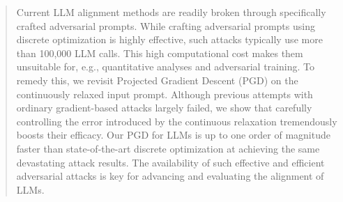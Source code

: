 \documentclass{article}
\theoremstyle{plain}
\theoremstyle{definition}
\theoremstyle{remark}
\begin{document}



\printAffiliationsAndNotice{\icmlEqualContribution} %

\begin{abstract}
Current LLM alignment methods are readily broken through specifically crafted adversarial prompts. While crafting adversarial prompts using discrete optimization is highly effective, such attacks typically use more than 100,000 LLM calls. This high computational cost makes them unsuitable for, e.g., quantitative analyses and adversarial training. To remedy this, we revisit Projected Gradient Descent (PGD) on the continuously relaxed input prompt. Although previous attempts with ordinary gradient-based attacks largely failed, we show that carefully controlling the error introduced by the continuous relaxation tremendously boosts their efficacy. Our PGD for LLMs is up to one order of magnitude faster than state-of-the-art discrete optimization at achieving the same devastating attack results. The availability of such effective and efficient adversarial attacks is key for advancing and evaluating the alignment of LLMs.
\end{abstract}
\end{document}
